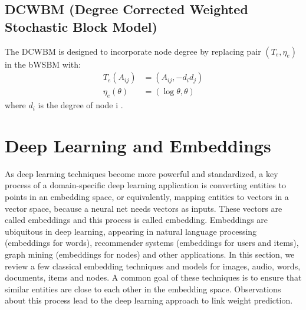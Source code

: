 \documentclass[11pt,twocolumn]{article}
\begin{document}
\subsection{DCWBM (Degree Corrected Weighted Stochastic Block Model)}
The DCWBM is designed to incorporate node degree
by replacing pair $ (T_e, \eta_e) $ in the bWSBM with:
\begin{align*}
	T_e(A_{ij}) &= (A_{ij}, -d_id_j)\\
	\eta_e(\theta) &= (\log\theta, \theta)
\end{align*}
where $ d_i $ is the degree of node i \cite{aicher2014learning}.

\section{Deep Learning and Embeddings}
As deep learning techniques become more powerful and standardized,
a key process of a domain-specific deep learning application
is converting entities to points in an embedding space, or equivalently,
mapping entities to vectors in a vector space,
because a neural net needs vectors as inputs.
These vectors are called embeddings and this process is called embedding.
Embeddings are ubiquitous in deep learning,
appearing in natural language processing (embeddings for words), recommender systems (embeddings for users and items),
graph mining (embeddings for nodes) and other applications.
In this section, we review a few classical embedding techniques and models for images, audio, words, documents, items and nodes.
A common goal of these techniques is to ensure that
similar entities are close to each other in the embedding space.
Observations about this process lead to the deep learning approach to link weight prediction.
\end{document}
